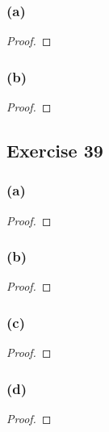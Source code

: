 \documentclass[14pt]{extarticle}
\begin{document}
\subsubsection{(a)}

\begin{proof}

\end{proof}

\subsubsection{(b)}

\begin{proof}

\end{proof}

\subsection{Exercise 39}

\subsubsection{(a)}

\begin{proof}

\end{proof}

\subsubsection{(b)}

\begin{proof}

\end{proof}

\subsubsection{(c)}

\begin{proof}

\end{proof}

\subsubsection{(d)}

\begin{proof}

\end{proof}
\end{document}
